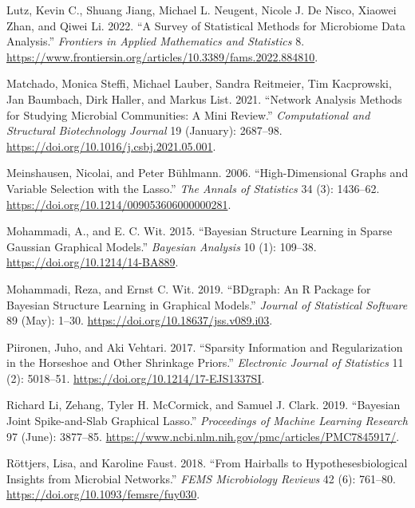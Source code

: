 \documentclass[
  letterpaper,
  DIV=11,
  numbers=noendperiod]{scrartcl}
\newlength{\cslhangindent}
\newlength{\cslentryspacingunit} %
\newenvironment{CSLReferences}[2] %
 {%
  \setlength{\parindent}{0pt}
  \ifodd #1
  \let\oldpar\par
  \def\par{\hangindent=\cslhangindent\oldpar}
  \fi
  \setlength{\parskip}{#2\cslentryspacingunit}
 }%
 {}
\begin{document}
\begin{CSLReferences}{1}{0}
\leavevmode{}%
Lutz, Kevin C., Shuang Jiang, Michael L. Neugent, Nicole J. De Nisco,
Xiaowei Zhan, and Qiwei Li. 2022. {``A Survey of Statistical Methods for
Microbiome Data Analysis.''} \emph{Frontiers in Applied Mathematics and
Statistics} 8.
\url{https://www.frontiersin.org/articles/10.3389/fams.2022.884810}.

\leavevmode{}%
Matchado, Monica Steffi, Michael Lauber, Sandra Reitmeier, Tim
Kacprowski, Jan Baumbach, Dirk Haller, and Markus List. 2021. {``Network
Analysis Methods for Studying Microbial Communities: A Mini Review.''}
\emph{Computational and Structural Biotechnology Journal} 19 (January):
2687--98. \url{https://doi.org/10.1016/j.csbj.2021.05.001}.

\leavevmode{}%
Meinshausen, Nicolai, and Peter Bühlmann. 2006. {``High-Dimensional
Graphs and Variable Selection with the Lasso.''} \emph{The Annals of
Statistics} 34 (3): 1436--62.
\url{https://doi.org/10.1214/009053606000000281}.

\leavevmode{}%
Mohammadi, A., and E. C. Wit. 2015. {``Bayesian Structure Learning in
Sparse Gaussian Graphical Models.''} \emph{Bayesian Analysis} 10 (1):
109--38. \url{https://doi.org/10.1214/14-BA889}.

\leavevmode{}%
Mohammadi, Reza, and Ernst C. Wit. 2019. {``BDgraph: An R Package for
Bayesian Structure Learning in Graphical Models.''} \emph{Journal of
Statistical Software} 89 (May): 1--30.
\url{https://doi.org/10.18637/jss.v089.i03}.

\leavevmode{}%
Piironen, Juho, and Aki Vehtari. 2017. {``Sparsity Information and
Regularization in the Horseshoe and Other Shrinkage Priors.''}
\emph{Electronic Journal of Statistics} 11 (2): 5018--51.
\url{https://doi.org/10.1214/17-EJS1337SI}.

\leavevmode{}%
Richard Li, Zehang, Tyler H. McCormick, and Samuel J. Clark. 2019.
{``Bayesian Joint Spike-and-Slab Graphical Lasso.''} \emph{Proceedings
of Machine Learning Research} 97 (June): 3877--85.
\url{https://www.ncbi.nlm.nih.gov/pmc/articles/PMC7845917/}.

\leavevmode{}%
Röttjers, Lisa, and Karoline Faust. 2018. {``From Hairballs to
Hypotheses{\textendash}biological Insights from Microbial Networks.''}
\emph{FEMS Microbiology Reviews} 42 (6): 761--80.
\url{https://doi.org/10.1093/femsre/fuy030}.


\end{CSLReferences}
\end{document}
